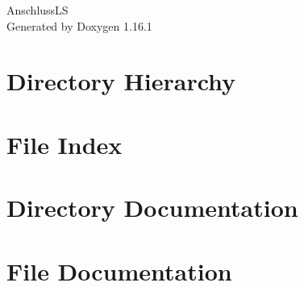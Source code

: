 \documentclass[twoside]{book}
\newcommand{\+}{\discretionary{\mbox{\scriptsize$\hookleftarrow$}}{}{}}
\newcommand{\clearemptydoublepage}{%
    \newpage{\pagestyle{empty}\cleardoublepage}%
  }
\begin{document}
  \raggedbottom
  \begin{titlepage}
  \vspace*{7cm}
  \begin{center}%
  {\Large Anschluss\+LS}\\
  \vspace*{1cm}
  {\large Generated by Doxygen 1.16.1}\\
  \end{center}
  \end{titlepage}
  \clearemptydoublepage
  \tableofcontents
  \clearemptydoublepage
\chapter{Directory Hierarchy}

\chapter{File Index}

\chapter{Directory Documentation}






\chapter{File Documentation}


  \backmatter
  \newpage
  \clearemptydoublepage
  \printindex
\end{document}
